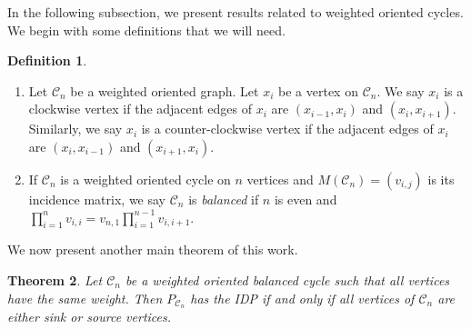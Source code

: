 \documentclass [12pt,a4paper,reqno]{amsart}
\theoremstyle{plain}
\newtheorem{Theorem}{Theorem}[section]
\theoremstyle{definition}
\newtheorem{Assumptions and Discussion}[Theorem]{Assumptions and Discussion}
\newtheorem{Definition}[Theorem]{Definition}
\theoremstyle{remark}
\newcommand\calC{\mathcal{C}}
\begin{document}
In the following subsection, we present results related to weighted oriented cycles. We begin with some definitions that we will need.

\begin{Definition}\label{balanced}
\begin{enumerate}[a]
    \item Let $\calC_n$ be a weighted oriented graph. Let $x_i$ be a vertex on $\calC_n$. We say $x_i$ is a clockwise vertex if the adjacent edges of $x_i$ are $(x_{i-1},x_i)$ and $(x_{i},x_{i+1})$. Similarly, we say $x_i$ is a counter-clockwise vertex if the adjacent edges of $x_i$ are $(x_{i},x_{i-1})$ and $(x_{i+1},x_{i})$. 
    \item If $\calC_n$ is a weighted oriented cycle on $n$ vertices and $M(\calC_n)=(v_{i,j})$ is its incidence matrix, we say $\calC_n$ is \emph{balanced} if $n$ is even and $\prod_{i=1}^{n}v_{i,i}=v_{n,1}\prod_{i=1}^{n-1}v_{i,i+1}$.
\end{enumerate}
\end{Definition}




We now present another main theorem of this work.

\begin{Theorem}\label{balanced}
Let $\calC_{n}$ be a weighted oriented balanced cycle such that all vertices have the same weight. Then $P_{\calC_{n}}$ has the IDP if and only if all vertices of $\calC_n$ are either sink or source vertices. 
\end{Theorem}
\end{document}
